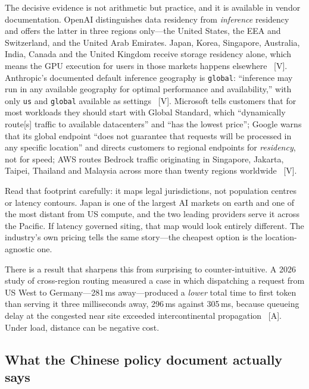 The decisive evidence is not arithmetic but practice, and it is available in vendor documentation. OpenAI distinguishes data residency from \emph{inference} residency and offers the latter in three regions only---the United States, the EEA and Switzerland, and the United Arab Emirates. Japan, Korea, Singapore, Australia, India, Canada and the United Kingdom receive storage residency alone, which means the GPU execution for users in those markets happens elsewhere~\cite{openai-residency} [V]. Anthropic's documented default inference geography is \texttt{global}: ``inference may run in any available geography for optimal performance and availability,'' with only \texttt{us} and \texttt{global} available as settings~\cite{anthropic-residency} [V]. Microsoft tells customers that for most workloads they should start with Global Standard, which ``dynamically route[s] traffic to available datacenters'' and ``has the lowest price''; Google warns that its global endpoint ``does not guarantee that requests will be processed in any specific location'' and directs customers to regional endpoints for \emph{residency}, not for speed; AWS routes Bedrock traffic originating in Singapore, Jakarta, Taipei, Thailand and Malaysia across more than twenty regions worldwide~\cite{azure-global,vertex-global,bedrock-cris} [V].

Read that footprint carefully: it maps legal jurisdictions, not population centres or latency contours. Japan is one of the largest AI markets on earth and one of the most distant from US compute, and the two leading providers serve it across the Pacific. If latency governed siting, that map would look entirely different. The industry's own pricing tells the same story---the cheapest option is the location-agnostic one.

There is a result that sharpens this from surprising to counter-intuitive. A 2026 study of cross-region routing measured a case in which dispatching a request from US West to Germany---281\,ms away---produced a \emph{lower} total time to first token than serving it three milliseconds away, 296\,ms against 305\,ms, because queueing delay at the congested near site exceeded intercontinental propagation~\cite{gorgo} [A]. Under load, distance can be negative cost.

\subsection{What the Chinese policy document actually says}

